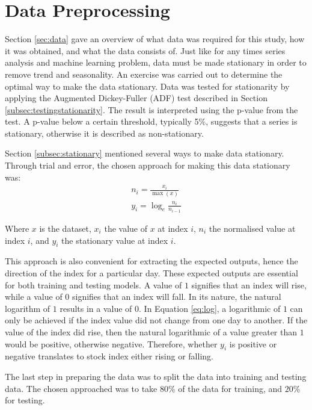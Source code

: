 \documentclass{UoYCSproject}
\begin{document}
\section{Data Preprocessing}
\label{sec:datapreprocessing}
Section \ref{sec:data} gave an overview of what data was required for this study, how it was obtained, and what the data consists of. Just like for any times series analysis and machine learning problem, data must be made stationary in order to remove trend and seasonality. An exercise was carried out to determine the optimal way to make the data stationary. Data was tested for stationarity by applying the Augmented Dickey-Fuller (ADF) test described in Section \ref{subsec:testingstationarity}. The result is interpreted using the p-value from the test. A p-value below a certain threshold, typically 5\%, suggests that a series is stationary, otherwise it is described as non-stationary. 

Section \ref{subsec:stationary} mentioned several ways to make data stationary. Through trial and error, the chosen approach for making this data stationary was:
\begin{align}
n_i = \frac{x_i}{\max(x)} \label{eq:normalised} \\ 
y_i = \log_e\frac{n_i}{n_{i-1}} \label{eq:log} 
\end{align}

Where $x$ is the dataset, $x_i$ the value of $x$ at index $i$, $n_i$ the normalised value at index $i$, and $y_i$ the stationary value at index $i$. 

This approach is also convenient for extracting the expected outputs, hence the direction of the index for a particular day. These expected outputs are essential for both training and testing models. A value of $1$ signifies that an index will rise, while a value of $0$ signifies that an index will fall. In its nature, the natural logarithm of $1$ results in a value of 0. In Equation \ref{eq:log}, a logarithmic of $1$ can only be achieved if the index value did not change from one day to another. If the value of the index did rise, then the natural logarithmic of a value greater than $1$ would be positive, otherwise negative. Therefore, whether $y_i$ is positive or negative translates to stock index either rising or falling.

The last step in preparing the data was to split the data into training and testing data. The chosen approached was to take $80$\% of the data for training, and $20$\% for testing.
\end{document}
